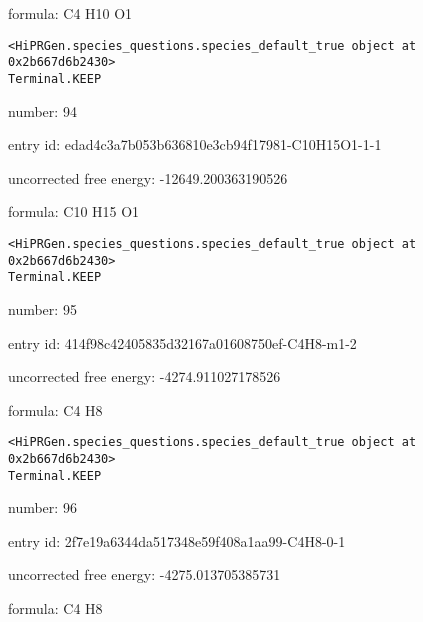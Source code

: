 \documentclass{article}
\begin{document}
formula: C4 H10 O1


\vspace{1cm}
\begin{verbatim}
<HiPRGen.species_questions.species_default_true object at 0x2b667d6b2430>
Terminal.KEEP
\end{verbatim}


number: 94



entry id: edad4c3a7b053b636810e3cb94f17981-C10H15O1-1-1



uncorrected free energy: -12649.200363190526



formula: C10 H15 O1


\vspace{1cm}
\begin{verbatim}
<HiPRGen.species_questions.species_default_true object at 0x2b667d6b2430>
Terminal.KEEP
\end{verbatim}


number: 95



entry id: 414f98c42405835d32167a01608750ef-C4H8-m1-2



uncorrected free energy: -4274.911027178526



formula: C4 H8


\vspace{1cm}
\begin{verbatim}
<HiPRGen.species_questions.species_default_true object at 0x2b667d6b2430>
Terminal.KEEP
\end{verbatim}


number: 96



entry id: 2f7e19a6344da517348e59f408a1aa99-C4H8-0-1



uncorrected free energy: -4275.013705385731



formula: C4 H8

\end{document}
